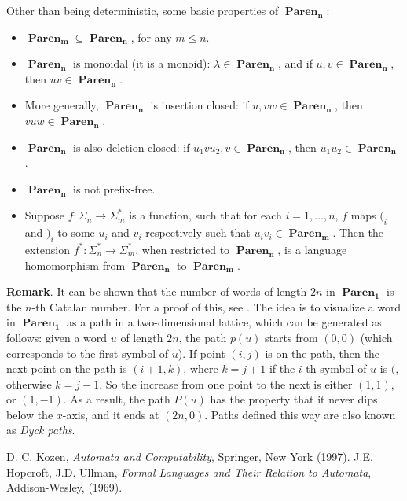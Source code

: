 \documentclass[12pt]{article}
\begin{document}
Other than being deterministic, some basic properties of $\boldsymbol{\operatorname{Paren}_n}$:
\begin{itemize}
\item $\boldsymbol{\operatorname{Paren}_m} \subseteq \boldsymbol{\operatorname{Paren}_n}$, for any $m\le n$.
\item $\boldsymbol{\operatorname{Paren}_n}$ is monoidal (it is a monoid): $\lambda \in \boldsymbol{\operatorname{Paren}_n}$, and if $u,v\in \boldsymbol{\operatorname{Paren}_n}$, then $uv\in \boldsymbol{\operatorname{Paren}_n}$.
\item More generally, $\boldsymbol{\operatorname{Paren}_n}$ is insertion closed: if $u, vw \in \boldsymbol{\operatorname{Paren}_n}$, then $vuw \in \boldsymbol{\operatorname{Paren}_n}$.
\item $\boldsymbol{\operatorname{Paren}_n}$ is also deletion closed: if $u_1vu_2, v \in \boldsymbol{\operatorname{Paren}_n}$, then $u_1u_2 \in \boldsymbol{\operatorname{Paren}_n}$.
\item $\boldsymbol{\operatorname{Paren}_n}$ is not prefix-free.
\item Suppose $f:\Sigma_n \to \Sigma_m^*$ is a function, such that for each $i=1,\ldots, n$, $f$ maps $(_i$ and $)_i$ to some $u_i$ and $v_i$ respectively such that $u_iv_i \in \boldsymbol{\operatorname{Paren}_m}$.  Then the extension $f^*: \Sigma_n^* \to \Sigma_m^*$, when restricted to $\boldsymbol{\operatorname{Paren}_n}$, is a language homomorphism from $\boldsymbol{\operatorname{Paren}_n}$ to $\boldsymbol{\operatorname{Paren}_m}$.
\end{itemize}

\textbf{Remark}.  It can be shown that the number of words of length $2n$ in $\boldsymbol{\operatorname{Paren}_1}$ is the $n$-th Catalan number.  For a proof of this, see .  The idea is to visualize a word in $\boldsymbol{\operatorname{Paren}_1}$ as a path in a two-dimensional lattice, which can be generated as follows: given a word $u$ of length $2n$, the path $p(u)$ starts from $(0,0)$ (which corresponds to the first symbol of $u$).  If point $(i,j)$ is on the path, then the next point on the path is $(i+1,k)$, where $k=j+1$ if the $i$-th symbol of $u$ is $($, otherwise $k=j-1$.  So the increase from one point to the next is either $(1,1)$, or $(1,-1)$.  As a result, the path $P(u)$ has the property that it never dips below the $x$-axis, and it ends at $(2n,0)$.  Paths defined this way are also known as \emph{Dyck paths}.

\begin{thebibliography}{9}
 D. C. Kozen, {\em Automata and Computability}, Springer, New York (1997).
 J.E. Hopcroft, J.D. Ullman, {\em Formal Languages and Their Relation to Automata}, Addison-Wesley, (1969).
\end{thebibliography}
\end{document}
